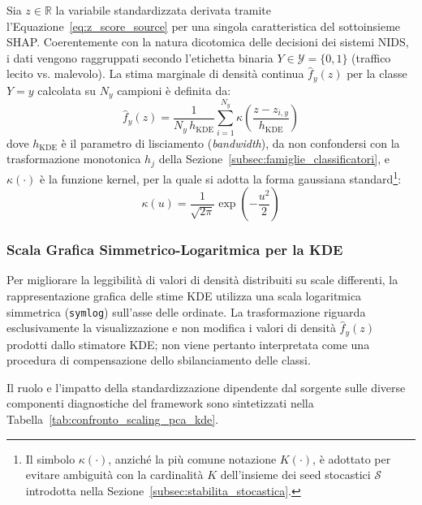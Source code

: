 Sia $z \in \mathbb{R}$ la variabile standardizzata derivata tramite l'Equazione~\eqref{eq:z_score_source} per una singola caratteristica del sottoinsieme SHAP. Coerentemente con la natura dicotomica delle decisioni dei sistemi NIDS, i dati vengono raggruppati secondo l'etichetta binaria $Y \in \mathcal{Y} = \{0, 1\}$ (traffico lecito vs. malevolo). La stima marginale di densità continua $\hat{f}_y(z)$ per la classe $Y=y$ calcolata su $N_y$ campioni è definita da:
\begin{equation}
    \hat{f}_y(z) = \frac{1}{N_y \, h_{\text{KDE}}} \sum_{i=1}^{N_y} \kappa\left( \frac{z - z_{i,y}}{h_{\text{KDE}}} \right)
    \label{eq:kde_univariate}
\end{equation}
dove $h_{\text{KDE}}$ è il parametro di lisciamento (\textit{bandwidth}), da non confondersi con la trasformazione monotonica $h_j$ della Sezione~\ref{subsec:famiglie_classificatori}, e $\kappa(\cdot)$ è la funzione kernel, per la quale si adotta la forma gaussiana standard\footnote{Il simbolo $\kappa(\cdot)$, anziché la più comune notazione $K(\cdot)$, è adottato per evitare ambiguità con la cardinalità $K$ dell'insieme dei seed stocastici $\mathcal{S}$ introdotta nella Sezione~\ref{subsec:stabilita_stocastica}.}:
\begin{equation}
    \kappa(u) = \frac{1}{\sqrt{2\pi}} \exp\left( -\frac{u^2}{2} \right)
    \label{eq:gaussian_kernel}
\end{equation}

\subsubsection{Scala Grafica Simmetrico-Logaritmica per la KDE}
\label{subsubsec:log_scale_kde}
Per migliorare la leggibilità di valori di densità distribuiti su scale differenti, la rappresentazione grafica delle stime KDE utilizza una scala logaritmica simmetrica (\texttt{symlog}) sull'asse delle ordinate. La trasformazione riguarda esclusivamente la visualizzazione e non modifica i valori di densità $\hat{f}_y(z)$ prodotti dallo stimatore KDE; non viene pertanto interpretata come una procedura di compensazione dello sbilanciamento delle classi.

Il ruolo e l'impatto della standardizzazione dipendente dal sorgente sulle diverse componenti diagnostiche del framework sono sintetizzati nella Tabella~\ref{tab:confronto_scaling_pca_kde}.

